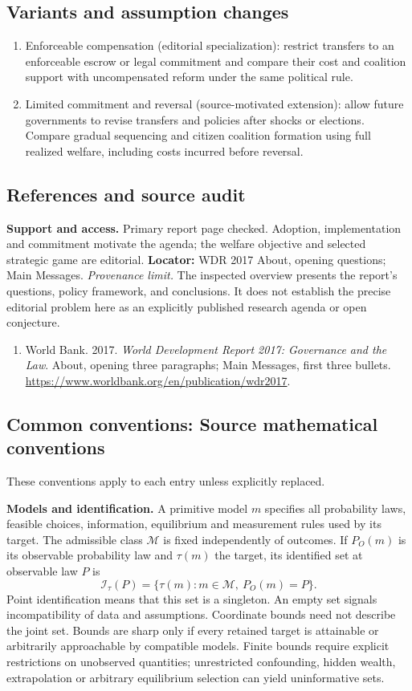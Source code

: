 \documentclass[11pt,a4paper]{article}
\begin{document}
\subsection*{Variants and assumption changes}
\begin{enumerate}
\item Enforceable compensation (editorial specialization): restrict transfers to an enforceable escrow or legal commitment and compare their cost and coalition support with uncompensated reform under the same political rule.
\item Limited commitment and reversal (source-motivated extension): allow future governments to revise transfers and policies after shocks or elections. Compare gradual sequencing and citizen coalition formation using full realized welfare, including costs incurred before reversal.
\end{enumerate}
\subsection*{References and source audit}
\textbf{Support and access.} Primary report page checked. Adoption, implementation and commitment motivate the agenda; the welfare objective and selected strategic game are editorial. \textbf{Locator:} WDR 2017 About, opening questions; Main Messages. \emph{Provenance limit.} The inspected overview presents the report's questions, policy framework, and conclusions. It does not establish the precise editorial problem here as an explicitly published research agenda or open conjecture.
\begin{enumerate}\raggedright
\item\hypertarget{definitions:source:30007671:1}{} World Bank. 2017. \emph{World Development Report 2017: Governance and the Law}. About, opening three paragraphs; Main Messages, first three bullets.
\url{https://www.worldbank.org/en/publication/wdr2017}.
\end{enumerate}

\subsection*{Common conventions: Source mathematical conventions}

These conventions apply to each entry unless explicitly replaced.

\textbf{Models and identification.} A primitive model \(m\) specifies all probability laws, feasible choices, information, equilibrium and measurement rules used by its target. The admissible class \(\mathcal M\) is fixed independently of outcomes. If \(P_O(m)\) is its observable probability law and \(\tau(m)\) the target, its identified set at observable law \(P\) is
\[
 \mathcal I_\tau(P)=\{\tau(m):m\in\mathcal M,\ P_O(m)=P\}.
\]
Point identification means that this set is a singleton. An empty set signals incompatibility of data and assumptions. Coordinate bounds need not describe the joint set. Bounds are sharp only if every retained target is attainable or arbitrarily approachable by compatible models. Finite bounds require explicit restrictions on unobserved quantities; unrestricted confounding, hidden wealth, extrapolation or arbitrary equilibrium selection can yield uninformative sets.
\end{document}
